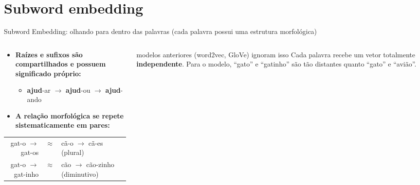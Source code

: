 
\section{Subword embedding}

\begin{frame}{Subword Embedding: olhando para dentro das palavras}
    {\footnotesize\color{gray}(cada palavra possui uma estrutura morfológica)}
    \begin{columns}[c]
        \begin{column}{0.49\textwidth}
            \footnotesize
            \begin{itemize}
                \item \textbf{Raízes e sufixos são compartilhados e possuem significado próprio:}
                \begin{itemize}
                    \item \textbf{ajud}-ar $\to$ \textbf{ajud}-ou $\to$ \textbf{ajud}-ando
                \end{itemize}
                \item \textbf{A relação morfológica se repete sistematicamente em pares:}
            \end{itemize}
            \vspace{0.1cm}
            \centering
            \footnotesize
            \begin{tabular}{rcl}
                gat-o $\to$ gat-os & $\approx$ & cã-o $\to$ cã-es {\tiny (plural)} \\
                gat-o $\to$ gat-inho & $\approx$ & cão $\to$ cão-zinho {\tiny (diminutivo)} \\
            \end{tabular}
        \end{column}
        \begin{column}{0.48\textwidth}
            \begin{alertblock}{modelos anteriores (word2vec, GloVe) ignoram isso}
                \scriptsize
                Cada palavra recebe um vetor totalmente \textbf{independente}. Para o modelo, ``gato'' e ``gatinho'' são tão distantes quanto ``gato'' e ``avião''.

\end{alertblock}
\end{column}
\end{columns}
\end{frame}
